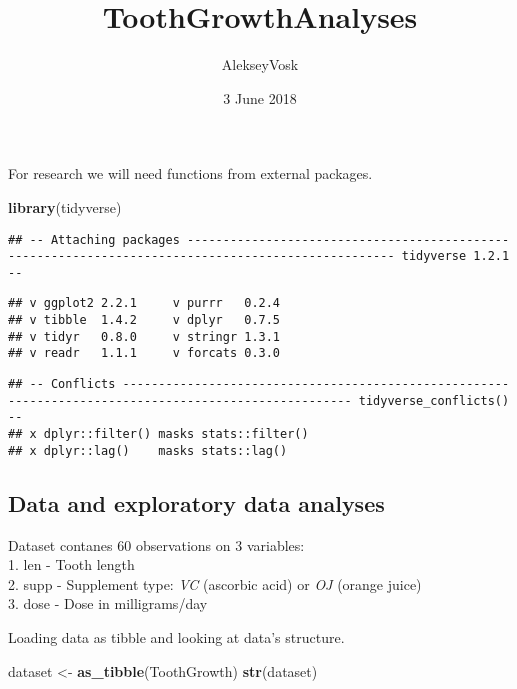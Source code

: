 \documentclass[]{article}
\title{ToothGrowthAnalyses}
\author{AlekseyVosk}
\date{3 June 2018}
\newenvironment{Shaded}{\begin{snugshade}}{\end{snugshade}}
\newcommand{\KeywordTok}[1]{\textcolor[rgb]{0.13,0.29,0.53}{\textbf{#1}}}
\newcommand{\StringTok}[1]{\textcolor[rgb]{0.31,0.60,0.02}{#1}}
\newcommand{\NormalTok}[1]{#1}
\begin{document}
\maketitle

For research we will need functions from external packages.

\begin{Shaded}
\begin{Highlighting}[]
\KeywordTok{library}\NormalTok{(tidyverse)}
\end{Highlighting}
\end{Shaded}

\begin{verbatim}
## -- Attaching packages --------------------------------------------------------------------------------------------------- tidyverse 1.2.1 --
\end{verbatim}

\begin{verbatim}
## v ggplot2 2.2.1     v purrr   0.2.4
## v tibble  1.4.2     v dplyr   0.7.5
## v tidyr   0.8.0     v stringr 1.3.1
## v readr   1.1.1     v forcats 0.3.0
\end{verbatim}

\begin{verbatim}
## -- Conflicts ------------------------------------------------------------------------------------------------------ tidyverse_conflicts() --
## x dplyr::filter() masks stats::filter()
## x dplyr::lag()    masks stats::lag()
\end{verbatim}

\subsection{Data and exploratory data
analyses}\label{data-and-exploratory-data-analyses}

Dataset contanes 60 observations on 3 variables:\\
1. len - Tooth length\\
2. supp - Supplement type: \emph{VC} (ascorbic acid) or \emph{OJ}
(orange juice)\\
3. dose - Dose in milligrams/day

Loading data as tibble and looking at data's structure.

\begin{Shaded}
\begin{Highlighting}[]
\NormalTok{dataset <-}\StringTok{ }\KeywordTok{as_tibble}\NormalTok{(ToothGrowth)}
\KeywordTok{str}\NormalTok{(dataset)}
\end{Highlighting}
\end{Shaded}
\end{document}
